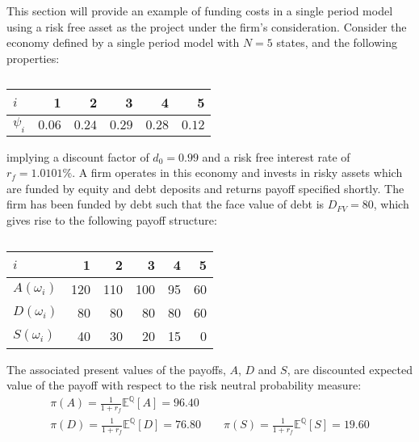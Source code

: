 \documentclass[main.tex]{subfiles}
\begin{document}
    This section will provide an example of funding costs in a single period model
    using a risk free asset as the project under the firm's consideration.
    Consider the economy defined by a single period model with $N=5$ states, and the following properties:
        \begin{table}[H]
            \centering
            \begin{tabular}{l|rrrrr}
                $i$ & 1 & 2 & 3 & 4 & 5 \\
                \hline
                $\psi_{i}$ & $0.06$ & $0.24$ & $0.29$ & $0.28$ & $0.12$ \\
            \end{tabular}
            \caption{}
            \label{tbl:example-firm-structure}
        \end{table}
    implying a discount factor of $d_{0} = 0.99$ and a risk free interest rate of $r_{f} = 1.0101\%$.
    A firm operates in this economy and invests in risky assets 
    which are funded by equity and debt deposits and returns payoff specified shortly.
    The firm has been funded by debt such that the face value of debt is $D_{FV} = 80$, 
    which gives rise to the following payoff structure:
    \begin{table}[H]
        \centering
        \begin{tabular}{l|rrrrr}
            $i$ & 1 & 2 & 3 & 4 & 5 \\
            \hline
            $A(\omega_{i})$ & 120 & 110 & 100 & 95 & 60 \\
            $D(\omega_{i})$ & 80 & 80 & 80 & 80 & 60 \\
            $S(\omega_{i})$ & 40 & 30 & 20 & 15 & 0
        \end{tabular}
        \caption{}
    \end{table}
    The associated present values of the payoffs, $A$, $D$ and $S$, 
    are discounted expected value of the payoff with respect to the risk neutral probability measure:
        \begin{gather}
            \pi(A) = \frac{1}{1+r_{f}} \mathbb{E}^{\mathbb{Q}}\left[A\right] = 96.40 \\
            \pi(D) = \frac{1}{1+r_{f}} \mathbb{E}^{\mathbb{Q}}\left[D\right] = 76.80
            \qquad \pi(S) = \frac{1}{1+r_{f}} \mathbb{E}^{\mathbb{Q}}\left[S\right] = 19.60
        \end{gather}
\end{document}
